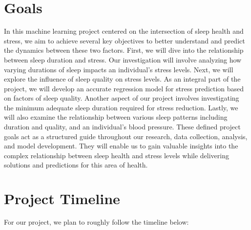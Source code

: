 \documentclass[11pt, letterpaper]{article}
\begin{document}
    \section*{Goals}
    In this machine learning project centered on the intersection of sleep health and stress, we aim to achieve several key objectives to better understand and predict the dynamics 
    between these two factors. First, we will dive into the relationship between sleep duration and stress. Our investigation will involve analyzing how varying durations of sleep 
    impacts an individual's stress levels. Next, we will explore the influence of sleep quality on stress levels. As an integral part of the project, we will develop an accurate 
    regression model for stress prediction based on factors of sleep quality. Another aspect of our project involves investigating the minimum adequate sleep duration required 
    for stress reduction. Lastly, we will also examine the relationship between various sleep patterns including duration and quality, and an individual's blood pressure. These 
    defined project goals act as a structured guide throughout our research, data collection, analysis, and model development. They will enable us to gain valuable insights into the 
    complex relationship between sleep health and stress levels while delivering solutions and predictions for this area of health.

    \newpage

    \section*{Project Timeline}
    For our project, we plan to roughly follow the timeline below:
    
\end{document}
